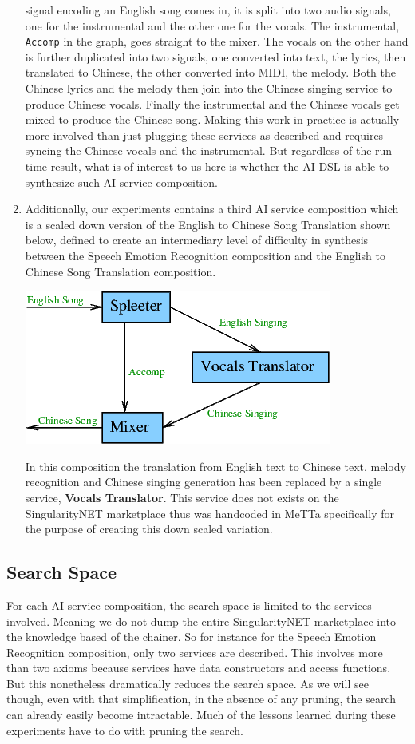 \documentclass[]{report}
\begin{document}
\begin{enumerate}
  signal encoding an English song comes in, it is split into two audio
  signals, one for the instrumental and the other one for the vocals.
  The instrumental, \texttt{Accomp} in the graph, goes straight to the
  mixer.  The vocals on the other hand is further duplicated into two
  signals, one converted into text, the lyrics, then translated to
  Chinese, the other converted into MIDI, the melody.  Both the
  Chinese lyrics and the melody then join into the Chinese singing
  service to produce Chinese vocals.  Finally the instrumental and the
  Chinese vocals get mixed to produce the Chinese song.  Making this
  work in practice is actually more involved than just plugging these
  services as described and requires syncing the Chinese vocals and
  the instrumental.  But regardless of the run-time result, what is of
  interest to us here is whether the AI-DSL is able to synthesize such
  AI service composition.
\item Additionally, our experiments contains a third AI service
  composition which is a scaled down version of the English to Chinese
  Song Translation shown below, defined to create an intermediary
  level of difficulty in synthesis between the Speech Emotion
  Recognition composition and the English to Chinese Song Translation
  composition.
  \begin{center}
    \includegraphics[scale=0.6]{figs/EnglishToChineseSongScaledDown.png}
  \end{center}
  In this composition the translation from English text to Chinese
  text, melody recognition and Chinese singing generation has been
  replaced by a single service, \textbf{Vocals Translator}.  This
  service does not exists on the SingularityNET marketplace thus was
  handcoded in MeTTa specifically for the purpose of creating this
  down scaled variation.
\end{enumerate}
\subsection{Search Space}
For each AI service composition, the search space is limited to the
services involved.  Meaning we do not dump the entire SingularityNET
marketplace into the knowledge based of the chainer.  So for instance
for the Speech Emotion Recognition composition, only two services are
described.  This involves more than two axioms because services have
data constructors and access functions.  But this nonetheless
dramatically reduces the search space.  As we will see though, even
with that simplification, in the absence of any pruning, the search
can already easily become intractable.  Much of the lessons learned
during these experiments have to do with pruning the search.
\end{document}
